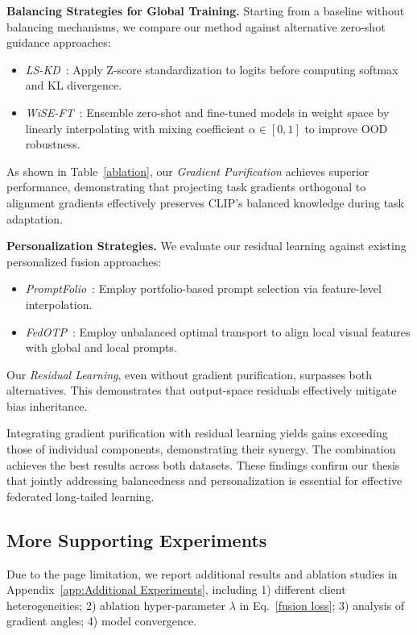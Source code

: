 \documentclass[10pt,twocolumn,letterpaper]{article}
\begin{document}
\noindent \textbf{Balancing Strategies for Global Training.}
Starting from a baseline without balancing mechanisms, we compare our method against alternative zero-shot guidance approaches:
\begin{itemize}
    \item \textit{LS-KD}~\cite{sun2024logit}: Apply Z-score standardization to logits before computing softmax and KL divergence.
    \item \textit{WiSE-FT}~\cite{wortsman2022robust}: Ensemble zero-shot and fine-tuned models in weight space by linearly interpolating with mixing coefficient $\alpha \in [0, 1]$ to improve OOD robustness.
    
\end{itemize}
As shown in Table~\ref{ablation}, our \textit{Gradient Purification} achieves superior performance, demonstrating that projecting task gradients orthogonal to alignment gradients effectively preserves CLIP's balanced knowledge during task adaptation.





\noindent \textbf{Personalization Strategies.}
We evaluate our residual learning against existing personalized fusion approaches:
\begin{itemize}
    \item \textit{PromptFolio}~\cite{pan2024promptfolio}: Employ portfolio-based prompt selection via feature-level interpolation.
    \item \textit{FedOTP}~\cite{li2024fedotp}: Employ unbalanced optimal transport to align local visual features with global and local prompts.
\end{itemize}
Our \textit{Residual Learning}, even without gradient purification, surpasses both alternatives. This demonstrates that output-space residuals effectively mitigate bias inheritance.

Integrating gradient purification with residual learning yields gains exceeding those of individual components, demonstrating their synergy. The combination achieves the best results across both datasets. These findings confirm our thesis that jointly addressing balancedness and personalization is essential for effective federated long-tailed learning.

\subsection{More Supporting Experiments}
Due to the page limitation, we report additional results and ablation studies in Appendix~\ref{app:Additional Experiments}, including 1) different client heterogeneities; 2) ablation hyper-parameter $\lambda$ in Eq.~\ref{fusion loss}; 3) analysis of gradient angles; 4) model convergence.
\end{document}
